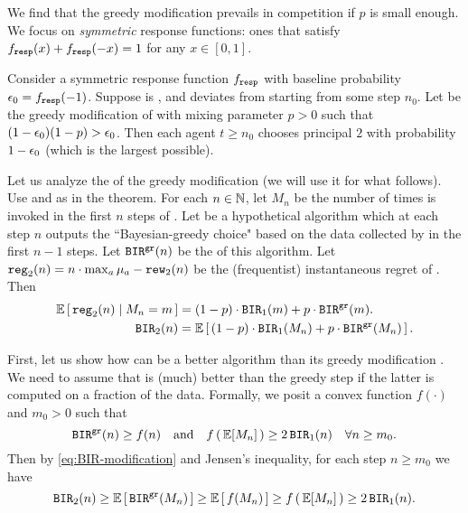 
We find that the greedy modification prevails in competition if $p$ is small enough. We focus on \emph{symmetric} response functions: ones that satisfy 
$f_{\mathtt{resp}}(x)+f_{\mathtt{resp}}(-x)=1$ for any $x\in[0,1]$.

\begin{theorem}\label{thm:random-greedy}
Consider a symmetric \HardMaxRandom response function $f_{\mathtt{resp}}$ with baseline probability $\epsilon_0 = f_{\mathtt{resp}}(-1)$. Suppose \alg[1] is \bmonotone, and deviates from \DynGreedy starting from some step $n_0$. Let \alg[2] be the greedy modification of \alg[1] with mixing parameter $p>0$ such that
    $(1-\epsilon_0)(1-p)>\epsilon_0$.
Then each agent $t\geq n_0$ chooses principal $2$ with probability $1-\epsilon_0$ (which is the largest possible).
\end{theorem}

Let us analyze the \BIR of the greedy modification (we will use it for what follows). Use \alg[1] and \alg[2] as in the theorem. For each $n\in\mathbb{N}$, let $M_n$ be the number of times \alg[1] is invoked in the first $n$ steps of \alg[2]. Let \alggr be a hypothetical algorithm which at each step $n$ outputs the ``Bayesian-greedy choice" based on the data collected by \alg[1] in the first $n-1$ steps. Let $\mathtt{BIR}^{\texttt{gr}}(n)$ be the \BIR of this algorithm. Let
    $\mathtt{reg}_2(n) = n\cdot \max_a \mu_a - \mathtt{rew}_2(n)$
be the (frequentist) instantaneous regret of \alg[2]. Then
\begin{align}
\E\sbr{ \mathtt{reg}_2(n) \mid M_n = m}
    &= (1-p) \cdot \BIR_1(m) + p \cdot \BIRgr(m). \nonumber \\
\BIR_2(n)
    &= \E\sbr{ (1-p) \cdot \BIR_1(M_n) + p \cdot \BIRgr(M_n) }.
    \label{eq:BIR-modification}
\end{align}

First, let us show how \alg[1] can be a better algorithm than its greedy modification \alg[2]. We need to assume that \alg[1] is (much) better than the greedy step \alggr if the latter is computed on a fraction of the data. Formally, we posit a convex function $f(\cdot)$ and $m_0>0$ such that
\[ \BIRgr(n) \geq f(n)
    \quad\text{and}\quad
    f\rbr{\E[M_n]} \geq 2\, \BIR_1(n) \quad \forall n\geq m_0 .  \]
Then by \eqref{eq:BIR-modification} and Jensen's inequality, for each step $n\geq m_0$ we have
\[\BIR_2(n)
    \geq  \E\sbr{ \BIRgr(M_n) }
    \geq \E\sbr{ f(M_n) }
    \geq f\rbr{ \E[M_n] }
    \geq 2\,\BIR_1(n). \]

